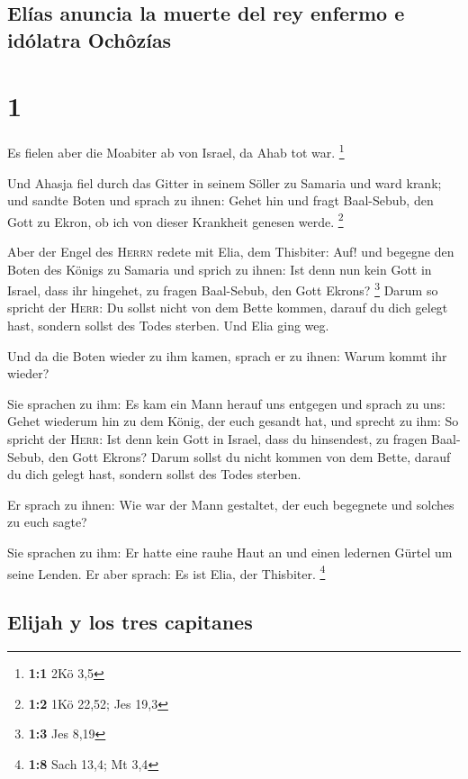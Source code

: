 \hypertarget{eluxedas-anuncia-la-muerte-del-rey-enfermo-e-iduxf3latra-ochuxf4zuxedas}{%
\subsection{Elías anuncia la muerte del rey enfermo e idólatra
Ochôzías}\label{eluxedas-anuncia-la-muerte-del-rey-enfermo-e-iduxf3latra-ochuxf4zuxedas}}

\hypertarget{section}{%
\section{1}\label{section}}

 Es fielen aber die Moabiter ab von Israel, da Ahab tot
war. \footnote{\textbf{1:1} 2Kö 3,5}

 Und Ahasja fiel durch das Gitter in seinem Söller zu
Samaria und ward krank; und sandte Boten und sprach zu ihnen: Gehet hin
und fragt Baal-Sebub, den Gott zu Ekron, ob ich von dieser Krankheit
genesen werde. \footnote{\textbf{1:2} 1Kö 22,52; Jes 19,3}

 Aber der Engel des \textsc{Herrn} redete mit Elia, dem
Thisbiter: Auf! und begegne den Boten des Königs zu Samaria und sprich
zu ihnen: Ist denn nun kein Gott in Israel, dass ihr hingehet, zu fragen
Baal-Sebub, den Gott Ekrons? \footnote{\textbf{1:3} Jes 8,19}
 Darum so spricht der \textsc{Herr}: Du sollst nicht von
dem Bette kommen, darauf du dich gelegt hast, sondern sollst des Todes
sterben. Und Elia ging weg.

 Und da die Boten wieder zu ihm kamen, sprach er zu ihnen:
Warum kommt ihr wieder?

 Sie sprachen zu ihm: Es kam ein Mann herauf uns entgegen
und sprach zu uns: Gehet wiederum hin zu dem König, der euch gesandt
hat, und sprecht zu ihm: So spricht der \textsc{Herr}: Ist denn kein
Gott in Israel, dass du hinsendest, zu fragen Baal-Sebub, den Gott
Ekrons? Darum sollst du nicht kommen von dem Bette, darauf du dich
gelegt hast, sondern sollst des Todes sterben.

 Er sprach zu ihnen: Wie war der Mann gestaltet, der euch
begegnete und solches zu euch sagte?

 Sie sprachen zu ihm: Er hatte eine rauhe Haut an und
einen ledernen Gürtel um seine Lenden. Er aber sprach: Es ist Elia, der
Thisbiter. \footnote{\textbf{1:8} Sach 13,4; Mt 3,4}

\hypertarget{elijah-y-los-tres-capitanes}{%
\subsection{Elijah y los tres
capitanes}\label{elijah-y-los-tres-capitanes}}

